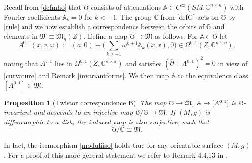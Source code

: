 \documentclass[JEP,XML,SOM,Unicode,published]{cedram}
\newcommand\mto{\mathchoice{\longmapsto}{\mapsto}{\mapsto}{\mapsto}}
\theoremstyle{plain}
\newtheorem{proposition}[theorem]{Proposition}
\theoremstyle{definition}
\newcommand{\A}{\mathbb{A}}
\newcommand{\G}{\mathbb{G}}
\newcommand{\C}{\mathbb{C}}
\newcommand{\M}{\mathfrak{M}}
\newcommand{\1}{{\bf 1}}
\begin{document}
\smallskip

Recall from \eqref{defmho} that $\mho$ consists of attenuations $\A\in C^\infty(SM,\C^{n\times n})$ with Fourier coefficients $\A_k=0$ for $k< -1$. The group $\G$ from \eqref{defG} acts on $\mho$ by \eqref{rule} and we now establish a correspondence between the orbits of $\G$ and elements in $\M\equiv \M_n(Z)$. Define a map $\mho \to
\M$ as follows: For $\A\in \mho$ let
\begin{equation}\label{littlea}
A^{0,1}(x,v,\omega) := (a,0)\equiv \biggl( \sum_{k\ge -1} \omega^{k+1} \A_k(x,v), 0 \biggr) \in \Omega^{0,1}(Z,\C^{n\times n}),
\end{equation}
noting that $A^{0,1}$ lies in $\Omega^{0,1}(Z,\C^{n\times n})$ and satisfies $(\bar \partial + A^{0,1})^2 = 0$ in view of \eqref{curvature} and Remark \ref{invariantforms}. We then map $\A$ to the equivalence class $[A^{0,1}]\in \M$.

\begin{proposition}[Twistor correspondence B]\label{tcB} The map $\mho \to \M$, $\A\mto [A^{0,1}]$ is $\G$-invariant and descends to an injective map $\mho /\G \to \M$. If $(M,g)$ is diffeomorphic to a disk, the induced map is also surjective, such that \begin{equation} \label{moduliiso}
\mho/\G\cong \M.
\end{equation}
\end{proposition}

In fact, the isomorphism \eqref{moduliiso} holds true for any orientable surface $(M,g)$. For a proof of this more general statement we refer to Remark 4.4.13 in \cite{Bohr-thesis}.
\end{document}
